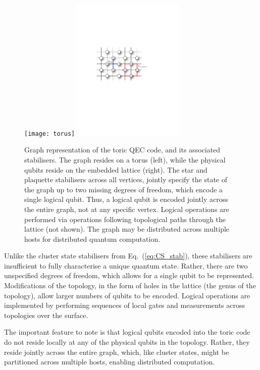 	\begin{figure}[!htbp]
		\texttt{[image: torus]}
		\includegraphics[clip=true, width=0.475\textwidth]{toric_code}
		\captionspacefig \caption{Graph representation of the toric QEC code, and its associated stabilisers. The graph resides on a torus (left), while the physical qubits reside on the embedded lattice (right). The star and plaquette stabilisers across all vertices, jointly specify the state of the graph up to two missing degrees of freedom, which encode a single logical qubit. Thus, a logical qubit is encoded jointly across the entire graph, not at any specific vertex. Logical operations are performed via operations following topological paths through the lattice (not shown). The graph may be distributed across multiple hosts for distributed quantum computation.} \label{fig:toric_code}
	\end{figure}
\fi

Unlike the cluster state stabilisers from Eq.~(\ref{eq:CS_stab}), these stabilisers are insufficient to fully characterise a unique quantum state. Rather, there are two unspecified degrees of freedom, which allows for a single qubit to be represented. Modifications of the topology, in the form of holes in the lattice (the genus of the topology), allow larger numbers of qubits to be encoded. Logical operations are implemented by performing sequences of local gates and measurements across topologies over the surface.

The important feature to note is that logical qubits encoded into the toric code do not reside locally at any of the physical qubits in the topology. Rather, they reside jointly across the entire graph, which, like cluster states, might be partitioned across multiple hosts, enabling distributed computation.

